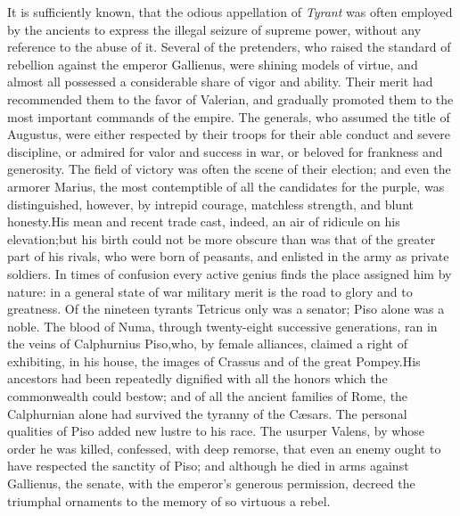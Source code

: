 
It is sufficiently known, that the odious appellation of \textit{Tyrant}
was often employed by the ancients to express the illegal seizure
of supreme power, without any reference to the abuse of it.
Several of the pretenders, who raised the standard of rebellion
against the emperor Gallienus, were shining models of virtue, and
almost all possessed a considerable share of vigor and ability.
Their merit had recommended them to the favor of Valerian, and
gradually promoted them to the most important commands of the
empire. The generals, who assumed the title of Augustus, were
either respected by their troops for their able conduct and
severe discipline, or admired for valor and success in war, or
beloved for frankness and generosity. The field of victory was
often the scene of their election; and even the armorer Marius,
the most contemptible of all the candidates for the purple, was
distinguished, however, by intrepid courage, matchless strength,
and blunt honesty.\footnotemark[160] His mean and recent trade cast, indeed, an
air of ridicule on his elevation;\footnotemark[1601] but his birth could not be
more obscure than was that of the greater part of his rivals, who
were born of peasants, and enlisted in the army as private
soldiers. In times of confusion every active genius finds the
place assigned him by nature: in a general state of war military
merit is the road to glory and to greatness. Of the nineteen
tyrants Tetricus only was a senator; Piso alone was a noble. The
blood of Numa, through twenty-eight successive generations, ran
in the veins of Calphurnius Piso,\footnotemark[161] who, by female alliances,
claimed a right of exhibiting, in his house, the images of
Crassus and of the great Pompey.\footnotemark[162] His ancestors had been
repeatedly dignified with all the honors which the commonwealth
could bestow; and of all the ancient families of Rome, the
Calphurnian alone had survived the tyranny of the Cæsars. The
personal qualities of Piso added new lustre to his race. The
usurper Valens, by whose order he was killed, confessed, with
deep remorse, that even an enemy ought to have respected the
sanctity of Piso; and although he died in arms against Gallienus,
the senate, with the emperor’s generous permission, decreed the
triumphal ornaments to the memory of so virtuous a rebel.\footnotemark[163]



